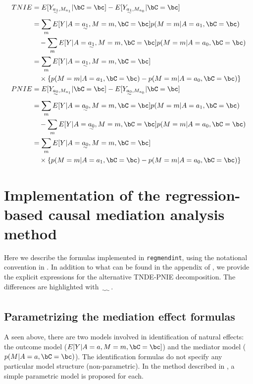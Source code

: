 \documentclass[10pt]{article}
\begin{document}
\begin{align*}
  TNIE
  &= E[Y_{\uwave{a_{1}},M_{a_{1}}} | \bC = \bc] - E[Y_{\uwave{a_{1}},M_{a_{0}}} | \bC = \bc]\\
  &=     \sum_{m} E[Y | A = \uwave{a_{1}}, M = m, \bC = \bc] p(M = m | A = a_{1}, \bC = \bc)\\
  &~~~ - \sum_{m} E[Y | A = \uwave{a_{1}}, M = m, \bC = \bc] p(M = m | A = a_{0}, \bC = \bc)\\
  &= \sum_{m} E[Y | A = \uwave{a_{1}}, M = m, \bC = \bc]\\
  &~~~ \times \left\{ p(M = m | A = a_{1}, \bC = \bc) - p(M = m | A = a_{0}, \bC = \bc) \right\}
  \\
  PNIE
   &= E[Y_{\uwave{a_{0}},M_{a_{1}}} | \bC = \bc] - E[Y_{\uwave{a_{0}},M_{a_{0}}} | \bC = \bc]\\
  &=     \sum_{m} E[Y | A = \uwave{a_{0}}, M = m, \bC = \bc] p(M = m | A = a_{1}, \bC = \bc)\\
  &~~~ - \sum_{m} E[Y | A = \uwave{a_{0}}, M = m, \bC = \bc] p(M = m | A = a_{0}, \bC = \bc)\\
  &= \sum_{m} E[Y | A = \uwave{a_{0}}, M = m, \bC = \bc]\\
  &~~~ \times \left\{ p(M = m | A = a_{1}, \bC = \bc) - p(M = m | A = a_{0}, \bC = \bc) \right\}
\end{align*}


\section{Implementation of the regression-based causal mediation analysis method}
\label{sec:org80dddd1}
Here we describe the formulas implemented in \texttt{regmendint}, using the notational convention in \cite{vanderweeleExplanationCausalInference2015,valeriMediationAnalysisAllowing2013,valeriSASMacroCausal2015}. In addition to what can be found in the appendix of \cite{vanderweeleExplanationCausalInference2015}, we provide the explicit expressions for the alternative TNDE-PNIE decomposition. The differences are highlighted with \(\uwave{~~~~}\).

\subsection{Parametrizing the mediation effect formulas}
\label{sec:orgb67e48a}
A seen above, there are two models involved in identification of natural effects: the outcome model (\(E[Y|A=a,M=m,\bC=\bc]\)) and the mediator model (\(p(M|A=a,\bC=\bc)\)). The identification formulas do not specify any particular model structure (non-parametric). In the method described in \cite{valeriMediationAnalysisAllowing2013,valeriSASMacroCausal2015}, a simple parametric model is proposed for each.\\
\end{document}
